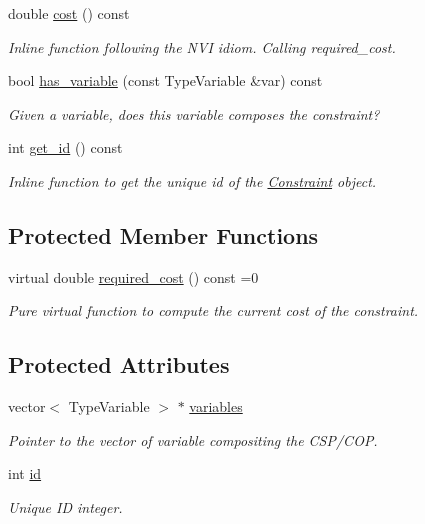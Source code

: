 \begin{DoxyCompactItemize}
double \hyperlink{classghost_1_1Constraint_a17995c5c52621d159c155ee789dce62a}{cost} () const 
\begin{DoxyCompactList}\small\item\em Inline function following the N\+VI idiom. Calling required\+\_\+cost. \end{DoxyCompactList}\item 
bool \hyperlink{classghost_1_1Constraint_a11376d095cb76243f9b832ecd682ed1e}{has\+\_\+variable} (const Type\+Variable \&var) const 
\begin{DoxyCompactList}\small\item\em Given a variable, does this variable composes the constraint? \end{DoxyCompactList}\item 
int \hyperlink{classghost_1_1Constraint_a0740fbf918c274ed99b4b186e859b83d}{get\+\_\+id} () const 
\begin{DoxyCompactList}\small\item\em Inline function to get the unique id of the \hyperlink{classghost_1_1Constraint}{Constraint} object. \end{DoxyCompactList}\end{DoxyCompactItemize}
\subsection*{Protected Member Functions}
\begin{DoxyCompactItemize}
\item 
virtual double \hyperlink{classghost_1_1Constraint_a92cde60cfccb2e08f76cf7b70a2dd41c}{required\+\_\+cost} () const =0
\begin{DoxyCompactList}\small\item\em Pure virtual function to compute the current cost of the constraint. \end{DoxyCompactList}\end{DoxyCompactItemize}
\subsection*{Protected Attributes}
\begin{DoxyCompactItemize}
\item 
vector$<$ Type\+Variable $>$ $\ast$ \hyperlink{classghost_1_1Constraint_a83305933e19440f42428da0726261c4a}{variables}
\begin{DoxyCompactList}\small\item\em Pointer to the vector of variable compositing the C\+S\+P/\+C\+OP. \end{DoxyCompactList}\item 
int \hyperlink{classghost_1_1Constraint_afffa2a41da00f31eff2e1b69b25541dc}{id}
\begin{DoxyCompactList}\small\item\em Unique ID integer. \end{DoxyCompactList}\end{DoxyCompactItemize}
